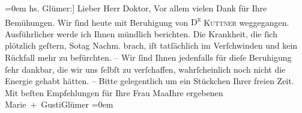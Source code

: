 \begin{ledgroupsized}[t]{13cm}
           \leftskip=0em{}{\bigskip}\pstart
           \noindent{}{\pb}{[}hs. Glümer:{]} Lieber Herr Doktor,\pend
           \pstart
           Vor allem vielen Dank für Ihre Bemühungen. Wir ſind heute mit Beruhigung
               von \textsc{D\textsuperscript{r}}{ }\textsc{Kuttner} weggegangen. Ausführlicher werde ich Ihnen mündlich berichten. Die Krankheit,
               die {\pb}ſich plötzlich geſtern, So{\geminationn}tag{ }Nachm. brach, iſt tatſächlich im Verſchwinden und kein Rückfall mehr zu befürchten. – Wir ſind Ihnen
               jedenfalls für dieſe Beruhigung ſehr dankbar, die wir uns ſelbſt zu verſchaffen, {\pb}wahrſcheinlich noch nicht die Energie gehabt hätten.
               – Bitte gelegentlich um ein Stückchen Ihrer freien Zeit.\pend
           \pstart
           Mit beſten Empfehlungen für Ihre Frau Ma{\geminationm}aIhre ergebenen {\\[\baselineskip]}\spacefill\mbox{Marie + GustiGlümer}\pend
           \leftskip=0em{}
         
         \endnumbering{}\end{ledgroupsized}  \newcommand{\dateiname}{L03056}\newcommand{\titel}{Paul Goldmann an Arthur Schnitzler, 29. 1. [1901]}\newcommand{\editorInnen}{Martin Anton Müller und Laura Untner}
      